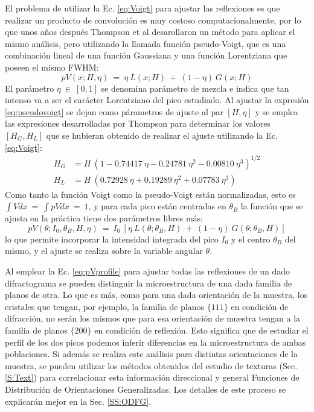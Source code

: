 El problema de utilizar la Ec. \ref{eq:Voigt} para ajustar las reflexiones es que realizar un producto de convolución es muy costoso computacionalmente, por lo que unos años después Thompson et al\cite{Thompson1987} desarollaron un método para aplicar el mismo análisis, pero utilizando la llamada función pseudo-Voigt, que es una combinación lineal de una función Gaussiana y una función Lorentziana que poseen el mismo FWHM:
\begin{equation}
  pV(x; H, \eta) \ = \ \eta \ L(x; H) \ + \ (1 - \eta) \ G(x; H)
  \label{eq:pseudovoigt}
\end{equation}
\noindent
El parámetro $\eta \ \in \ [0,1]$ se denomina parámetro de mezcla e indica que tan intenso va a ser el carácter Lorentziano del pico estudiado. 
Al ajustar la expresión \ref{eq:pseudovoigt} se dejan como párametros de ajuste al par $[H, \eta]$ y se emplea las expresiones desarrolladas por Thompson para determinar los valores $[H_G, H_L]$ que se hubieran obtenido de realizar el ajuste utilizando la Ec. \ref{eq:Voigt}:
\begin{align}
  H_G & =  H \ (1 -  0.74417 \ \eta - 0.24781 \ \eta^2 - 0.00810 \ \eta^3)^{1/2} \nonumber \\
  H_L & =  H \ (0.72928 \ \eta + 0.19289 \ \eta^2 + 0.07783 \ \eta^3)
  \label{eq:Hg}
\end{align}
\noindent
Como tanto la función Voigt como la pseudo-Voigt están normalizadas, esto es $\int V dx \ = \ \int pV dx \ = \ 1$, y para cada pico están centradas en $\theta_B$ la función que se ajusta en la práctica tiene dos parámetros libres más:
\begin{equation}
    pV(\theta; I_0, \theta_B, H, \eta) \ = \ I_0 \ [\eta \ L(\theta; \theta_B, H) \ + \ (1 - \eta) \ G(\theta; \theta_B, H)]
  \label{eq:pVprofile}
\end{equation}
\noindent
lo que permite incorporar la intensidad integrada del pico $I_0$ y el centro $\theta_B$ del mismo, y el ajuste se realiza sobre la variable angular $\theta$.

Al emplear la Ec. \ref{eq:pVprofile} para ajustar todas las reflexiones de un dado difractograma se pueden distinguir la microestructura de una dada familia de planos de otra.
Lo que es más, como para una dada orientación de la muestra, los cristales que tengan, por ejemplo, la familia de planos $\{111\}$ en condición de difracción, no serán los mismos que para esa orientación de muestra tengan a la familia de planos $\{200\}$ en condición de reflexión.
Esto significa que de estudiar el perfil de los dos picos podemos inferir diferencias en la microestructura de ambas poblaciones.
Si además se realiza este análisis para distintas orientaciones de la muestra, se pueden utilizar los métodos obtenidos del estudio de texturas (Sec. \ref{S:Text}) para correlacionar esta información direccional y general Funciones de Distribución de Orientaciones Generalizadas.
Los detalles de este proceso se explicarán mejor en la Sec. \ref{SS:ODFG}.

